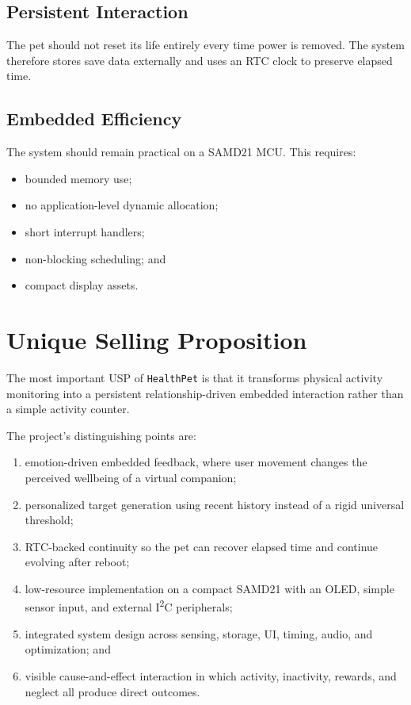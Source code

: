 \documentclass[conference]{IEEEtran}
\begin{document}
\subsection{Persistent Interaction}
The pet should not reset its life entirely every time power is removed. The system therefore stores save data externally and uses an RTC clock to preserve elapsed time.

\subsection{Embedded Efficiency}
The system should remain practical on a SAMD21 MCU. This requires:
\begin{itemize}
\item bounded memory use;
\item no application-level dynamic allocation;
\item short interrupt handlers;
\item non-blocking scheduling; and
\item compact display assets.
\end{itemize}

\section{Unique Selling Proposition}
The most important USP of \texttt{HealthPet} is that it transforms physical activity monitoring into a persistent relationship-driven embedded interaction rather than a simple activity counter.

The project's distinguishing points are:
\begin{enumerate}
\item emotion-driven embedded feedback, where user movement changes the perceived wellbeing of a virtual companion;
\item personalized target generation using recent history instead of a rigid universal threshold;
\item RTC-backed continuity so the pet can recover elapsed time and continue evolving after reboot;
\item low-resource implementation on a compact SAMD21 with an OLED, simple sensor input, and external I\textsuperscript{2}C peripherals;
\item integrated system design across sensing, storage, UI, timing, audio, and optimization; and
\item visible cause-and-effect interaction in which activity, inactivity, rewards, and neglect all produce direct outcomes.
\end{enumerate}
\end{document}
